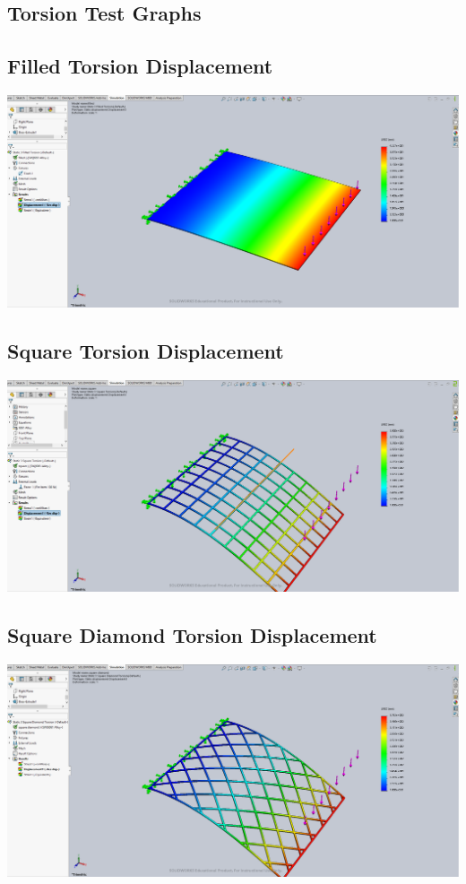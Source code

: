 \documentclass[12pt, letterpaper]{article}
\begin{document}
\begin{singlespace}
\section{Torsion Test Graphs}
\label{ap:to}

\subsection{Filled Torsion Displacement}
\label{ap:f-to-d}
\includegraphics[width=0.8\linewidth]{./graphs/torsion/filled-torsion-displacement}

\subsection{Square Torsion Displacement}
\label{ap:s-to-d}
\includegraphics[width=0.8\linewidth]{./graphs/torsion/square-torsion-displacement}

\subsection{Square Diamond Torsion Displacement}
\label{ap:sd-to-d}
\includegraphics[width=0.8\linewidth]{./graphs/torsion/square-diamond-torsion-displacement}


\end{singlespace}
\end{document}
